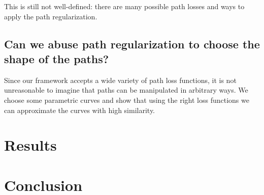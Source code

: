 \documentclass[../main.tex]{subfiles}
\begin{document}
This is still not well-defined: there are many possible path losses and ways to apply the path regularization.

\subsection{Can we abuse path regularization to choose the shape of the paths?}

Since our framework accepts a wide variety of path loss functions, it is not unreasonable to imagine that paths can be manipulated in arbitrary ways.
We choose some parametric curves and show that using the right loss functions we can approximate the curves with high similarity.

\section{Results}

\section{Conclusion}
\end{document}
